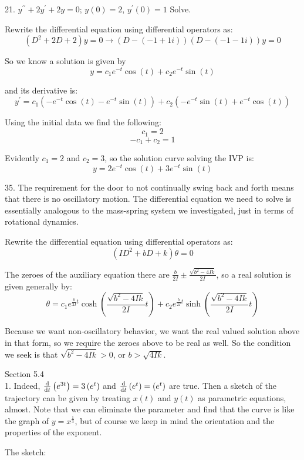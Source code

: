 \documentclass[11pt]{article}
\newcommand{\br}[1]{\left(#1\right)}
\newcommand{\dprime}{\prime\prime}
\begin{document}
21. $y^{\dprime} + 2y^{\prime} + 2y = 0$; $y(0) = 2$, $y^{\prime}(0) = 1$ Solve.

Rewrite the differential equation using differential operators as:
$$\br{D^2 + 2D + 2}y = 0 \to \br{D-\br{-1+1i}}\br{D-\br{-1-1i}}y = 0$$

So we know a solution is given by
$$y = c_1e^{-t}\cos(t) + c_2e^{-t}\sin(t)$$

and its derivative is:
$$y^{\prime} = c_1\br{-e^{-t}\cos(t)-e^{-t}\sin(t)} + c_2\br{-e^{-t}\sin(t)+e^{-t}\cos(t)}$$

Using the initial data we find the following:
$$c_1 = 2$$
$$-c_1 + c_2 = 1$$

Evidently $c_1 = 2$ and $c_2 = 3$, so the solution curve solving the IVP is:
$$y = 2e^{-t}\cos(t) + 3e^{-t}\sin(t)$$

35. The requirement for the door to not continually swing back and forth means that there is no oscillatory motion. The differential equation we need to solve is essentially analogous to the mass-spring system we investigated, just in terms of rotational dynamics.

Rewrite the differential equation using differential operators as:
$$\br{ID^2 + bD + k}\theta = 0$$

The zeroes of the auxiliary equation there are $\frac{b}{2I} \pm \frac{\sqrt{b^2-4Ik}}{2I}$, so a real solution is given generally by:
$$\theta = c_1e^{\frac{b}{2I} t}\cosh(\frac{\sqrt{b^2-4Ik}}{2I} t) + c_2e^{\frac{b}{2I} t}\sinh(\frac{\sqrt{b^2-4Ik}}{2I} t)$$

Because we want non-oscillatory behavior, we want the real valued solution above in that form, so we require the zeroes above to be real as well. So the condition we seek is that $\sqrt{b^2-4Ik} > 0$, or $b > \sqrt{4Ik}$.

Section 5.4 \\

1. Indeed, $\dv{t}\br{e^{3t}} = 3\br{e^t}$ and $\dv{t}\br{e^t} = \br{e^t}$ are true. Then a sketch of the trajectory can be given by treating $x(t)$ and $y(t)$ as parametric equations, almost. Note that we can eliminate the parameter and find that the curve is like the graph of $y=x^{\frac{1}{3}}$, but of course we keep in mind the orientation and the properties of the exponent.

The sketch:
\end{document}
